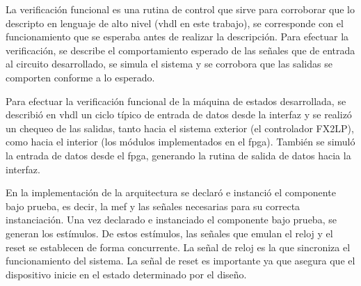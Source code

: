 La verificación funcional es una rutina de control que sirve para corroborar que lo descripto en lenguaje de alto nivel (\acrshort{vhdl} en este trabajo), se corresponde con el funcionamiento que se esperaba antes de realizar la descripción. Para efectuar la verificación, se describe el comportamiento esperado de las señales que de entrada al circuito desarrollado, se simula el sistema y se corrobora que las salidas se comporten conforme a lo esperado.

Para efectuar la verificación funcional de la máquina de estados desarrollada, se describió en \acrshort{vhdl} un ciclo típico de entrada de datos desde la interfaz y se realizó un chequeo de las salidas, tanto hacia el sistema exterior (el controlador FX2LP), como hacia el interior (los módulos implementados en el \acrshort{fpga}). También se simuló la entrada de datos desde el \acrshort{fpga}, generando la rutina de salida de datos hacia la interfaz.

%

En la implementación de la arquitectura se declaró e instanció el componente bajo prueba, es decir, la \acrshort{mef} y las señales necesarias para su correcta instanciación.
Una vez declarado e instanciado el componente bajo prueba, se generan los estímulos. De estos estímulos, las señales que emulan el reloj y el reset se establecen de forma concurrente. La señal de reloj es la que sincroniza el funcionamiento del sistema. La señal de reset es importante ya que asegura que el dispositivo inicie en el estado determinado por el diseño. 

